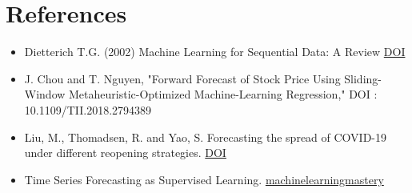 \documentclass[12pt,a4paper]{article}
\begin{document}
\section*{References}
\begin{itemize}
    \item Dietterich T.G. (2002) Machine Learning for Sequential Data: A Review
    \href{https://doi.org/10.1007/3-540-70659-3_2}{DOI}
    \item J. Chou and T. Nguyen, "Forward Forecast of Stock Price Using Sliding-Window Metaheuristic-Optimized Machine-Learning Regression,"
     DOI : 10.1109/TII.2018.2794389
    \item Liu, M., Thomadsen, R. and Yao, S. Forecasting the spread of COVID-19 under different reopening strategies. 
      \href{https://doi.org/10.1038/s41598-020-77292-8}{DOI}
    \item Time Series Forecasting as Supervised Learning. \href{https://machinelearningmastery.com/time-series-forecasting-supervised-learning/}{machinelearningmastery}
\end{itemize}
\end{document}
